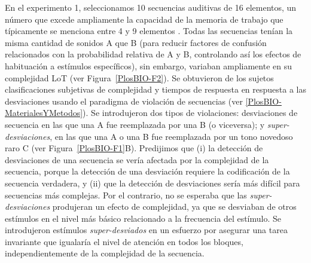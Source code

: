 
En el experimento 1, seleccionamos 10 secuencias auditivas de 16 elementos, un número que excede ampliamente la capacidad de la memoria de trabajo que típicamente se menciona entre 4 y 9 elementos \cite{f25,f29,f86}. Todas las secuencias tenían la misma cantidad de sonidos A que B (para reducir factores de confusión relacionados con la probabilidad relativa de A y B, controlando así los efectos de habituación a estímulos específicos), sin embargo, variaban ampliamente en su complejidad LoT (ver Figura~\ref{PlosBIO-F2}). Se obtuvieron de los sujetos clasificaciones subjetivas de complejidad y tiempos de respuesta en respuesta a las desviaciones usando el paradigma de violación de secuencias (ver \ref{PlosBIO-MaterialesYMetodos}). Se introdujeron dos tipos de violaciones: desviaciones de secuencia en las que una A fue reemplazada por una B (o viceversa); y \textit{super-desviaciones}, en las que una A o una B fue reemplazada por un tono novedoso raro C (ver Figura~\ref{PlosBIO-F1}B). Predijimos que (i) la detección de desviaciones de una secuencia se vería afectada por la complejidad de la secuencia, porque la detección de una desviación requiere la codificación de la secuencia verdadera, y (ii) que la detección de desviaciones sería más difícil para secuencias más complejas. Por el contrario, no se esperaba que las \textit{super-desviaciones} produjeran un efecto de complejidad, ya que se desviaban de otros estímulos en el nivel más básico relacionado a la frecuencia del estímulo. Se introdujeron estímulos \textit{super-desviados} en un esfuerzo por asegurar una tarea invariante que igualaría el nivel de atención en todos los bloques, independientemente de la complejidad de la secuencia. 

